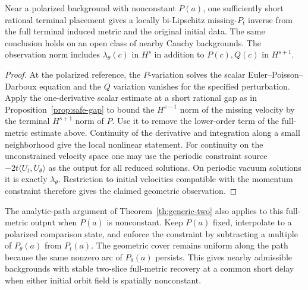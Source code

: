 \begin{proposition}
\label{prop:two-metric-polarized}
Near a polarized background with nonconstant $P(a)$,
one sufficiently short rational terminal placement gives
a locally bi-Lipschitz missing-$P_t$ inverse from the
full terminal induced metric and the original initial
data. The same conclusion holds on an open class of
nearby Cauchy backgrounds. The observation norm includes
$\lambda_\theta(c)$ in $H^s$ in addition to
$P(c),Q(c)$ in $H^{s+1}$.
\end{proposition}

\begin{proof}
At the polarized reference, the $P$-variation solves
the scalar Euler--Poisson--Darboux equation and the $Q$
variation vanishes for the specified perturbation.
Apply the one-derivative scalar estimate at a short
rational gap as in Proposition~\ref{prop:safe-gap}
to bound the $H^{s-1}$ norm of the missing velocity by
the terminal $H^{s+1}$ norm of $P$.
Use it to remove the lower-order term of the
full-metric estimate above. Continuity of the
derivative and integration along a small neighborhood
give the local nonlinear statement.
For continuity on the unconstrained velocity space
one may use the periodic constraint source
$-2t\langle U_t,U_\theta\rangle$ as the output for all
reduced solutions. On periodic vacuum solutions it is
exactly $\lambda_\theta$. Restriction to initial
velocities compatible with the momentum constraint
therefore gives the claimed geometric observation.
\end{proof}

The analytic-path argument of Theorem~\ref{th:generic-two}
also applies to this full-metric output when $P(a)$ is
nonconstant. Keep $P(a)$ fixed, interpolate to a
polarized comparison state, and enforce the constraint
by subtracting a multiple of $P_\theta(a)$ from $P_t(a)$.
The geometric cover remains uniform along the path
because the same nonzero arc of $P_\theta(a)$ persists.
This gives nearby admissible backgrounds with stable
two-slice full-metric recovery at a common short delay
when either initial orbit field is spatially nonconstant.
